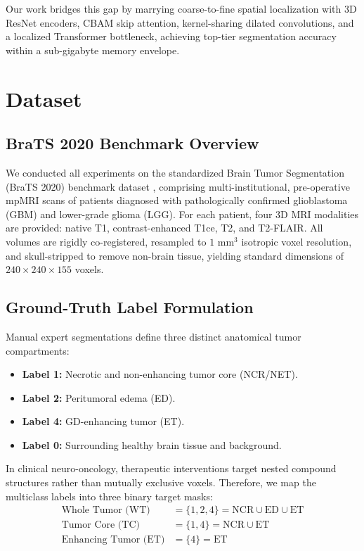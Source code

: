 \documentclass[12pt, a4paper]{article}
\begin{document}
Our work bridges this gap by marrying coarse-to-fine spatial localization with 3D ResNet encoders, CBAM skip attention, kernel-sharing dilated convolutions, and a localized Transformer bottleneck, achieving top-tier segmentation accuracy within a sub-gigabyte memory envelope.

\section{Dataset}

\subsection{BraTS 2020 Benchmark Overview}
We conducted all experiments on the standardized Brain Tumor Segmentation (BraTS 2020) benchmark dataset \cite{bakas2018identifying, menze2014multimodal}, comprising multi-institutional, pre-operative mpMRI scans of patients diagnosed with pathologically confirmed glioblastoma (GBM) and lower-grade glioma (LGG). For each patient, four 3D MRI modalities are provided: native T1, contrast-enhanced T1ce, T2, and T2-FLAIR. All volumes are rigidly co-registered, resampled to $1 \text{ mm}^3$ isotropic voxel resolution, and skull-stripped to remove non-brain tissue, yielding standard dimensions of $240 \times 240 \times 155$ voxels.

\subsection{Ground-Truth Label Formulation}
Manual expert segmentations define three distinct anatomical tumor compartments:
\begin{itemize}[leftmargin=*, itemsep=4pt]
    \item \textbf{Label 1:} Necrotic and non-enhancing tumor core (NCR/NET).
    \item \textbf{Label 2:} Peritumoral edema (ED).
    \item \textbf{Label 4:} GD-enhancing tumor (ET).
    \item \textbf{Label 0:} Surrounding healthy brain tissue and background.
\end{itemize}

In clinical neuro-oncology, therapeutic interventions target nested compound structures rather than mutually exclusive voxels. Therefore, we map the multiclass labels into three binary target masks:
\begin{align}
    \text{Whole Tumor (WT)} &= \{1, 2, 4\} = \text{NCR} \cup \text{ED} \cup \text{ET} \\
    \text{Tumor Core (TC)} &= \{1, 4\} = \text{NCR} \cup \text{ET} \\
    \text{Enhancing Tumor (ET)} &= \{4\} = \text{ET}
\end{align}
\end{document}

